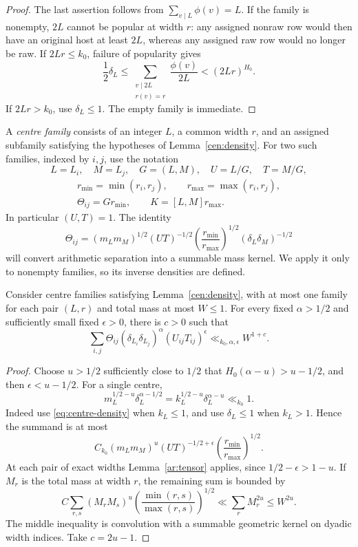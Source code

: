\begin{proof}
The last assertion follows from $\sum_{v\mid L}\phi(v)=L$.
If the family is nonempty, $2L$ cannot be popular at width $r$: any
assigned nonraw row would then have an original host at least $2L$,
whereas any assigned raw row would no longer be raw. If $2Lr\le k_0$,
failure of popularity gives
\[
 \frac12\delta_L
 \le\sum_{\substack{v\mid2L\\r(v)=r}}\frac{\phi(v)}{2L}
 <(2Lr)^{H_0}.
\]
If $2Lr>k_0$, use $\delta_L\le1$. The empty family is immediate.
\end{proof}

A \emph{centre family} consists of an integer $L$, a common width $r$,
and an assigned subfamily satisfying the hypotheses of
Lemma~\ref{cen:density}. For two such families, indexed by $i,j$, use the notation
\[
 L=L_i,\quad M=L_j,\quad G=(L,M),\quad U=L/G,\quad T=M/G,
\]
\[
 \begin{gathered}
 r_{\min}=\min(r_i,r_j),\qquad r_{\max}=\max(r_i,r_j),\\
 \Theta_{ij}=G r_{\min},\qquad K=[L,M]r_{\max}.
 \end{gathered}
\]
In particular $(U,T)=1$. The identity
\begin{equation}
 \Theta_{ij}
 =(m_Lm_M)^{1/2}(UT)^{-1/2}
 \left(\frac{r_{\min}}{r_{\max}}\right)^{1/2}
 (\delta_L\delta_M)^{-1/2}
 \label{eq:centre-kernel}
\end{equation}
will convert arithmetic separation into a summable mass kernel. We
apply it only to nonempty families, so its inverse densities are defined.

\begin{lemma}
\label{cen:kernel}
Consider centre families satisfying Lemma~\ref{cen:density}, with at
most one family for each pair $(L,r)$ and total mass at most $W\le1$.
For every fixed $\alpha>1/2$ and sufficiently small fixed
$\epsilon>0$, there is $c>0$ such that
\[
 \sum_{i,j}\Theta_{ij}(\delta_{L_i}\delta_{L_j})^\alpha
 (U_{ij}T_{ij})^\epsilon
 \ll_{k_0,\alpha,\epsilon} W^{1+c}.
\]
\end{lemma}

\begin{proof}
Choose $u>1/2$ sufficiently close to $1/2$ that
$H_0(\alpha-u)>u-1/2$, and then $\epsilon<u-1/2$.
For a single centre,
\[
 m_L^{1/2-u}\delta_L^{\alpha-1/2}
 =k_L^{1/2-u}\delta_L^{\alpha-u}\ll_{k_0}1.
\]
Indeed use \eqref{eq:centre-density} when $k_L\le1$, and use
$\delta_L\le1$ when $k_L>1$. Hence the summand is at most
\[
 C_{k_0}(m_Lm_M)^u(UT)^{-1/2+\epsilon}
 \left(\frac{r_{\min}}{r_{\max}}\right)^{1/2}.
\]
At each pair of exact widths Lemma~\ref{ar:tensor} applies, since
$1/2-\epsilon>1-u$. If $M_r$ is the total mass at width $r$, the
remaining sum is bounded by
\[
 C\sum_{r,s}(M_rM_s)^u
 \left(\frac{\min(r,s)}{\max(r,s)}\right)^{1/2}
 \ll\sum_r M_r^{2u}\le W^{2u}.
\]
The middle inequality is convolution with a summable geometric kernel
on dyadic width indices. Take $c=2u-1$.
\end{proof}

